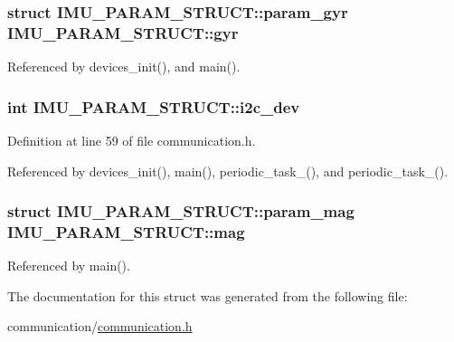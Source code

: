 \hypertarget{structIMU__PARAM__STRUCT_a5a4557868f1af679a1098808397b02ec}{
\subsubsection[{gyr}]{\setlength{\rightskip}{0pt plus 5cm}struct {\bf I\-M\-U\-\_\-\-P\-A\-R\-A\-M\-\_\-\-S\-T\-R\-U\-C\-T\-::param\-\_\-gyr} I\-M\-U\-\_\-\-P\-A\-R\-A\-M\-\_\-\-S\-T\-R\-U\-C\-T\-::gyr}}\label{structIMU__PARAM__STRUCT_a5a4557868f1af679a1098808397b02ec}


Referenced by devices\-\_\-init(), and main().

\hypertarget{structIMU__PARAM__STRUCT_a8a870f383fc9ba0b682fdc9b8c0d2734}{
\subsubsection[{i2c\-\_\-dev}]{\setlength{\rightskip}{0pt plus 5cm}int I\-M\-U\-\_\-\-P\-A\-R\-A\-M\-\_\-\-S\-T\-R\-U\-C\-T\-::i2c\-\_\-dev}}\label{structIMU__PARAM__STRUCT_a8a870f383fc9ba0b682fdc9b8c0d2734}


Definition at line 59 of file communication.\-h.



Referenced by devices\-\_\-init(), main(), periodic\-\_\-task\-\_(), and periodic\-\_\-task\-\_().

\hypertarget{structIMU__PARAM__STRUCT_a26b277dcaf05f3842995df888225f6f4}{
\subsubsection[{mag}]{\setlength{\rightskip}{0pt plus 5cm}struct {\bf I\-M\-U\-\_\-\-P\-A\-R\-A\-M\-\_\-\-S\-T\-R\-U\-C\-T\-::param\-\_\-mag} I\-M\-U\-\_\-\-P\-A\-R\-A\-M\-\_\-\-S\-T\-R\-U\-C\-T\-::mag}}\label{structIMU__PARAM__STRUCT_a26b277dcaf05f3842995df888225f6f4}


Referenced by main().



The documentation for this struct was generated from the following file\-:\begin{DoxyCompactItemize}
\item 
communication/\hyperlink{communication_2communication_8h}{communication.\-h}\end{DoxyCompactItemize}
